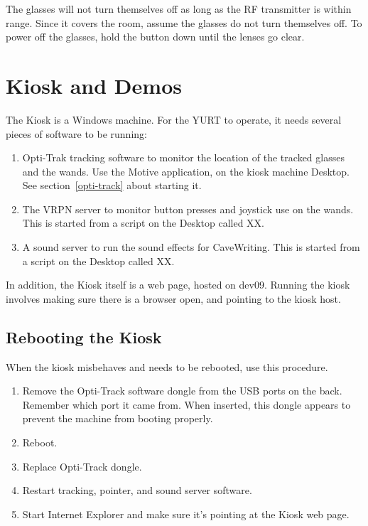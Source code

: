 \documentclass[11pt]{article}
\newcommand{\yurt}{YURT\xspace}
\begin{document}
The glasses will not turn themselves off as long as the RF transmitter
is within range.  Since it covers the room, assume the glasses do not
turn themselves off.  To power off the glasses, hold the button down
until the lenses go clear.

\section{Kiosk and Demos}

The Kiosk is a Windows machine.  For the \yurt to operate, it needs
several pieces of software to be running:

\begin{enumerate}
\item Opti-Trak tracking software to monitor the location of the
  tracked glasses and the wands.  Use the Motive application, on the
  kiosk machine Desktop.  See section~\ref{opti-track} about starting
  it. 

\item The VRPN server to monitor button presses and joystick use on
  the wands.  This is started from a script on the Desktop called XX.

\item A sound server to run the sound effects for CaveWriting.  This
  is started from a script on the Desktop called XX.

\end{enumerate}


In addition, the Kiosk itself is a web page, hosted on dev09.  Running
the kiosk involves making sure there is a browser open, and pointing
to the kiosk host.


\subsection{Rebooting the Kiosk}

When the kiosk misbehaves and needs to be rebooted, use this
procedure.

\begin{enumerate}
\item Remove the Opti-Track software dongle from the USB ports on the
  back.  Remember which port it came from.  When inserted, this dongle
  appears to prevent the machine from booting properly.

\item Reboot.

\item Replace Opti-Track dongle.

\item Restart tracking, pointer, and sound server software.

\item Start Internet Explorer and make sure it's pointing at the Kiosk
  web page.

\end{enumerate}
\end{document}
